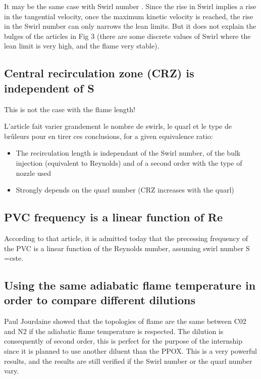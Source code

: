 It may be the same case with Swirl number \cite{milosavljevic_influence_1990}. Since the rise in Swirl implies a rise in the tangential velocity, once the maximum kinetic velocity is reached, the rise in the Swirl number can only narrows the lean limits. But it does not explain the bulges of the articles in Fig 3 (there are some discrete values of Swirl where the lean limit is very high, and the flame very stable).

\subsection{Central recirculation zone (CRZ) is independent of S}
This is not the case with the flame length! 

L'article\cite{milosavljevic_influence_1990}  fait varier grandement le nombre de swirls, le quarl et le type de brûleurs pour en tirer ces conclusions, for a given equivalence ratio:
\begin{itemize}
\item The recirculation length is independant of the Swirl number, of the bulk injection (equivalent to Reynolds) and of a second order with the type of nozzle used
\item Strongly depends on the quarl number (CRZ increases with the quarl)
\end{itemize}


\subsection{PVC frequency is a linear function of Re}
\cite{martinelli_experimental_2007} According to that article, it is admitted today that the precessing frequency of the PVC is a linear function of the Reynolds number, assuming swirl number S =cste.

\subsection{Using the same adiabatic flame temperature in order to compare different dilutions}
Paul Jourdaine \cite{paul_jourdaine_nom_effect_2016} showed that the topologies of flame are the same between C02 and N2 if the adiabatic flame temperature is respected. The dilution is consequently of second order, this is perfect for the purpose of the internship since it is planned to use another diluent than the PPOX. This is a very powerful results, and the results are still verified if the Swirl number or the quarl number vary.

